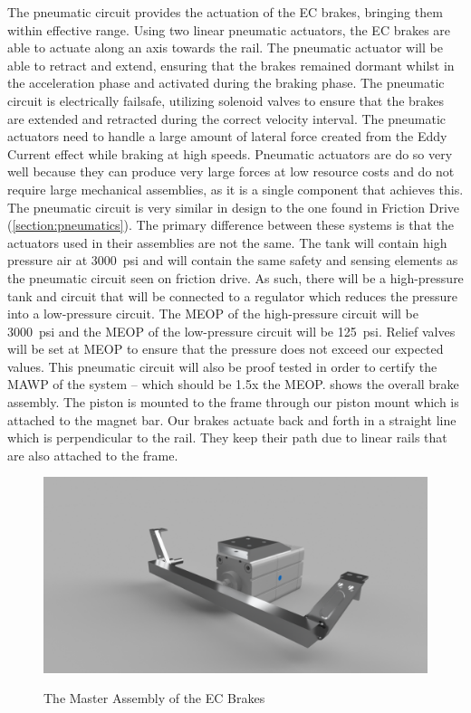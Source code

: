 \documentclass[main.tex]{subfiles}
\begin{document}
    The pneumatic circuit provides the actuation of the EC brakes, bringing them within effective range. Using two linear pneumatic actuators, the EC brakes are able to actuate along an axis towards the rail. The pneumatic actuator will be able to retract and extend, ensuring that the brakes remained dormant whilst in the acceleration phase and activated during the braking phase. The pneumatic circuit is electrically failsafe, utilizing solenoid valves to ensure that the brakes are extended and retracted during the correct velocity interval. The pneumatic actuators need to handle a large amount of lateral force created from the Eddy Current effect while braking at high speeds. Pneumatic actuators are do so very well because they can produce very large forces at low resource costs and do not require large mechanical assemblies, as it is a single component that achieves this. The pneumatic circuit is very similar in design to the one found in Friction Drive (\autoref{section:pneumatics}). The primary difference between these systems is that the actuators used in their assemblies are not the same.
    The tank will contain high pressure air at \SI{3000}{psi} and will contain the same safety and sensing elements as the pneumatic circuit seen on friction drive. As such, there will be a high-pressure tank and circuit that will be connected to a regulator which reduces the pressure into a low-pressure circuit. The MEOP of the high-pressure circuit will be \SI{3000}{psi} and the MEOP of the low-pressure circuit will be \SI{125}{psi}. Relief valves will be set at MEOP to ensure that the pressure does not exceed our expected values. This pneumatic circuit will also be proof tested in order to certify the MAWP of the system – which should be 1.5x the MEOP.  shows the overall brake assembly. The piston is mounted to the frame through our piston mount which is attached to the magnet bar. Our brakes actuate back and forth in a straight line which is perpendicular to the rail. They keep their path due to linear rails that are also attached to the frame.
    \begin{figure}
    	\centering
        \includegraphics[width=\linewidth]{images/EC_Brake_Master_2018}
        \label{fig:EC_Assembly}
        \caption{The Master Assembly of the EC Brakes}
    \end{figure}
\end{document}
